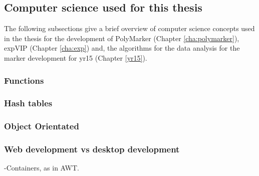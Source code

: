




\subsection{Computer science used for this thesis}

The following subsections give a brief overview of computer science concepts used in the thesis for the development of PolyMarker (Chapter \ref{cha:polymarker}), expVIP (Chapter \ref{cha:exp}) and, the algorithms for the data analysis for the marker development for \acrshort{yr15} (Chapter \ref{yr15}).  

\subsubsection{Functions}

\subsubsection{Hash tables}

\subsubsection{Object Orientated}

\subsubsection{Web development vs desktop development}




-Containers, as in AWT. 

